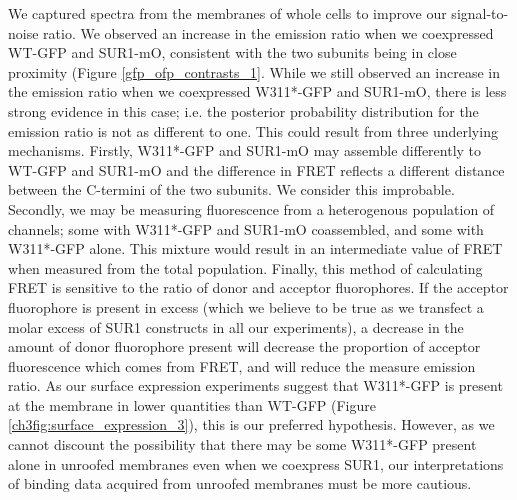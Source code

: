We captured spectra from the membranes of whole cells to improve our signal-to-noise ratio.
We observed an increase in the emission ratio when we coexpressed WT-GFP and SUR1-mO, consistent with the two subunits being in close proximity (Figure \ref{gfp_ofp_contrasts_1}.
While we still observed an increase in the emission ratio when we coexpressed W311*-GFP and SUR1-mO, there is less strong evidence in this case; i.e. the posterior probability distribution for the emission ratio is not as different to one.
This could result from three underlying mechanisms.
Firstly, W311*-GFP and SUR1-mO may assemble differently to WT-GFP and SUR1-mO and the difference in FRET reflects a different distance between the C-termini of the two subunits.
We consider this improbable.
Secondly, we may be measuring fluorescence from a heterogenous population of channels; some with W311*-GFP and SUR1-mO coassembled, and some with W311*-GFP alone.
This mixture would result in an intermediate value of FRET when measured from the total population.
Finally, this method of calculating FRET is sensitive to the ratio of donor and acceptor fluorophores.
If the acceptor fluorophore is present in excess (which we believe to be true as we transfect a molar excess of SUR1 constructs in all our experiments), a decrease in the amount of donor fluorophore present will decrease the proportion of acceptor fluorescence which comes from FRET, and will reduce the measure emission ratio.
As our surface expression experiments suggest that W311*-GFP is present at the membrane in lower quantities than WT-GFP (Figure \ref{ch3fig:surface_expression_3}), this is our preferred hypothesis.
However, as we cannot discount the possibility that there may be some W311*-GFP present alone in unroofed membranes even when we coexpress SUR1, our interpretations of binding data acquired from unroofed membranes must be more cautious.

